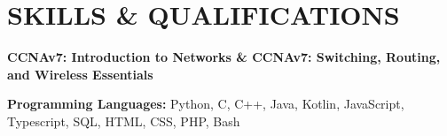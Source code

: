 \section{\color{airforceblue}SKILLS & QUALIFICATIONS}
\begin{itemize}[leftmargin=0in, label={}]
    \small{\item{
        \textbf{\normalsize{CCNAv7: Introduction to Networks \& CCNAv7: Switching, Routing, and Wireless Essentials }} \\
        \vspace{1.2pt}

        \textbf{\normalsize{Programming Languages:}}{ \normalsize{Python, C, C++, Java, Kotlin, JavaScript, Typescript, SQL, HTML, CSS, PHP, Bash}} \\
        \vspace{1.2pt}
    }}
\end{itemize}
\vspace{-16pt}